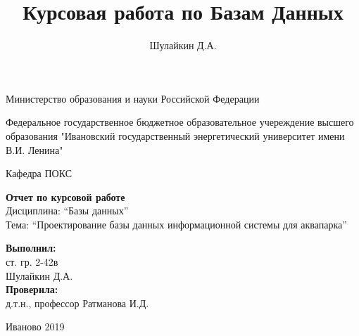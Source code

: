\documentclass[a4paper]{article}
\title{Курсовая работа по Базам Данных}
\author{Шулайкин Д.А.}
\begin{document}
\onehalfspacing
\thispagestyle{empty}

\begin{center}
Министерство образования и науки Российской Федерации
\vspace{10pt}

Федеральное государственное бюджетное образовательное учереждение высшего образования "Ивановский государственный энергетический университет имени В.И. Ленина"
\vspace{40pt}

Кафедра ПОКС
\vspace{40pt}

{ \LARGE \textbf{Отчет по курсовой работе} } \\
Дисциплина: ``Базы данных'' \\
Тема: ``Проектирование базы данных информационной системы для аквапарка'' \\
\end{center}

\vspace{330pt}

\begin{flushright}
\textbf{Выполнил:} \\
ст. гр. 2-42в \\
Шулайкин Д.А. \\

\textbf{Проверила:} \\
д.т.н., профессор Ратманова И.Д.
\end{flushright}

\vspace{40pt}

\begin{center}
	Иваново 2019
\end{center}
\end{document}
